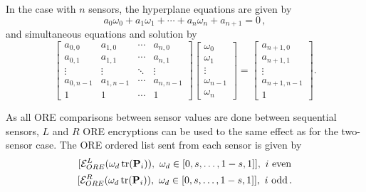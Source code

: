 \documentclass[letterpaper, 10 pt, conference]{ieeeconf}  %
\begin{document}
In the case with $n$ sensors, the hyperplane equations are given by
\begin{equation}
   a_0\omega_0 + a_1\omega_1 + \cdots + a_n\omega_n + a_{n+1} = 0\,, \label{eqn:hyperplane_eq}
\end{equation}
and simultaneous equations and solution by
\begin{equation}
   \begin{bmatrix}
      a_{0,0} & a_{1,0} & \cdots & a_{n,0} \\
      a_{0,1} & a_{1,1} & \cdots & a_{n,1} \\
      \vdots & \vdots & \ddots & \vdots \\
      a_{0,n-1} & a_{1,n-1} & \cdots & a_{n,n-1} \\
      1 & 1 & \cdots & 1
   \end{bmatrix}
   \begin{bmatrix}
      \omega_0 \\
      \omega_1 \\
      \vdots \\
      \omega_{n-1} \\
      \omega_n
   \end{bmatrix}
   =
   \begin{bmatrix}
      a_{n+1,0} \\
      a_{n+1,1} \\
      \vdots \\
      a_{n+1,n-1} \\
      1
   \end{bmatrix}. \label{eqn:hyperplane_sol_eq}
\end{equation}

As all ORE comparisons between sensor values are done between sequential sensors, $L$ and $R$ ORE encryptions can be used to the same effect as for the two-sensor case. The ORE ordered list sent from each sensor is given by
\begin{equation}
   \begin{gathered} \label{eqn:sensor_lists}
      [\mathcal{E}^L_{ORE}(\omega_d\tr(\mP_i)),\ \omega_d \in [0,s,\dots,1-s,1]],\ i\text{ even} \\
      [\mathcal{E}^R_{ORE}(\omega_d\tr(\mP_i)),\ \omega_d \in [0,s,\dots,1-s,1]],\ i\text{ odd}\,.
   \end{gathered}
\end{equation}


\end{document}
